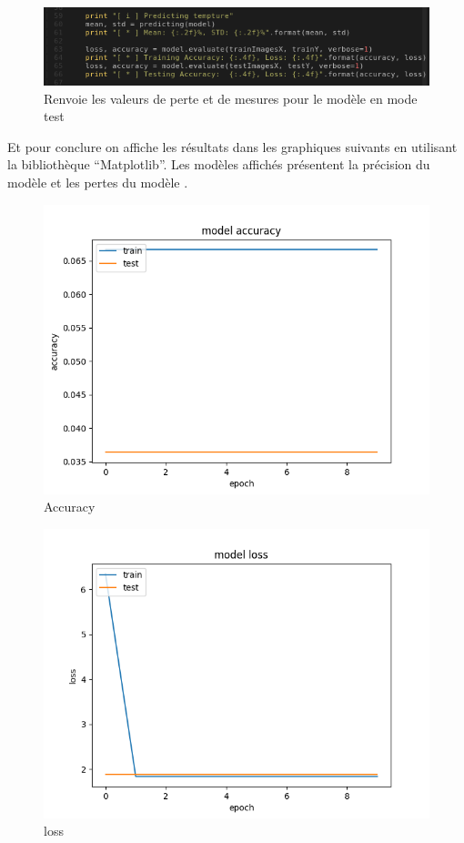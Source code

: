 \documentclass[12pt]{article}
\begin{document}
\begin{figure}[h]
	\centering
	\includegraphics[width=15cm]{img-Chapiter-4/predicting_value.png}
	\caption{Renvoie les valeurs de perte et de mesures pour le modèle en mode test}
	\label{fig:prediction}
\end{figure}

Et pour conclure on affiche les résultats dans les graphiques suivants en utilisant la bibliothèque “Matplotlib”. Les modèles affichés présentent la précision du modèle et les pertes du modèle .
\newpage
\begin{figure}[h]
	\centering
	\includegraphics[width=15cm]{img-Chapiter-4/Figure_1.png}
	\caption{Accuracy}
\end{figure}

\newpage
\begin{figure}[h]
	\centering
	\includegraphics[width=15cm]{img-Chapiter-4/Figure_1-1.png}
	\caption{loss}
\end{figure}


\newpage
{}
	

	
\end{document}
